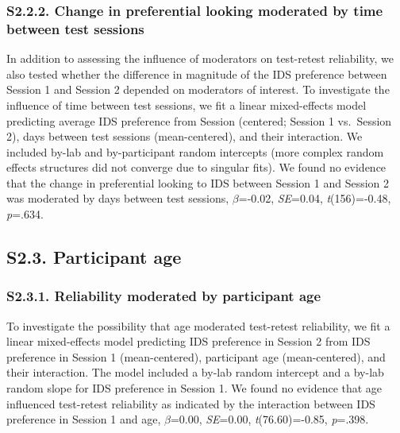 \documentclass[
  man, donotrepeattitle,floatsintext]{apa6}
\begin{document}
\hypertarget{s2.2.2.-change-in-preferential-looking-moderated-by-time-between-test-sessions}{%
\subsubsection{S2.2.2. Change in preferential looking moderated by time between test sessions}\label{s2.2.2.-change-in-preferential-looking-moderated-by-time-between-test-sessions}}

In addition to assessing the influence of moderators on test-retest reliability, we also tested whether the difference in magnitude of the IDS preference between Session 1 and Session 2 depended on moderators of interest.
To investigate the influence of time between test sessions, we fit a linear mixed-effects model predicting average IDS preference from Session (centered; Session 1 vs.~Session 2), days between test sessions (mean-centered), and their interaction.
We included by-lab and by-participant random intercepts (more complex random effects structures did not converge due to singular fits).
We found no evidence that the change in preferential looking to IDS between Session 1 and Session 2 was moderated by days between test sessions, \(\beta\)=-0.02, \emph{SE}=0.04, \emph{t}(156)=-0.48, \emph{p}=.634.

\hypertarget{s2.3.-participant-age}{%
\subsection{S2.3. Participant age}\label{s2.3.-participant-age}}

\hypertarget{s2.3.1.-reliability-moderated-by-participant-age}{%
\subsubsection{S2.3.1. Reliability moderated by participant age}\label{s2.3.1.-reliability-moderated-by-participant-age}}

To investigate the possibility that age moderated test-retest reliability, we fit a linear mixed-effects model predicting IDS preference in Session 2 from IDS preference in Session 1 (mean-centered), participant age (mean-centered), and their interaction.
The model included a by-lab random intercept and a by-lab random slope for IDS preference in Session 1.
We found no evidence that age influenced test-retest reliability as indicated by the interaction between IDS preference in Session 1 and age, \(\beta\)=0.00, \emph{SE}=0.00, \emph{t}(76.60)=-0.85, \emph{p}=.398.
\end{document}
